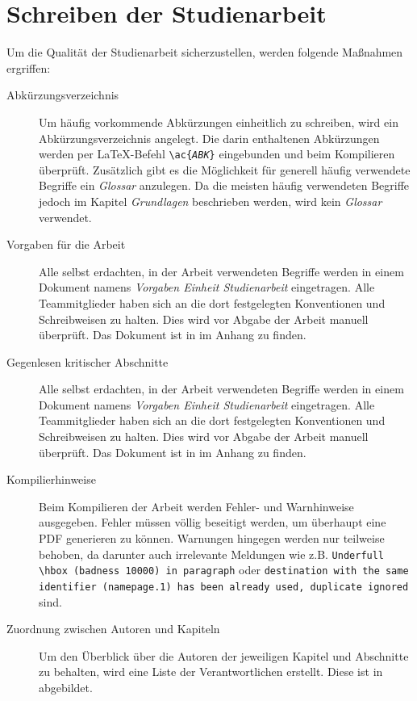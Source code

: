 \documentclass[
	pdftex,
	fontsize=12pt,          %
	DIV10,                  %
	ngerman,                %
	paper=a4,               %
	twoside=false,          %
	titlepage,              %
	parskip=half,           %
	headings=normal,        %
	listof=nochaptergap,  %
	bibliography=totoc, %
	index=totoc,            %
	captions=tableheading,  %
	final                 %
]{scrreprt}
\begin{document}
\section{Schreiben der Studienarbeit}
Um die Qualität der Studienarbeit sicherzustellen, werden folgende Maßnahmen ergriffen:

\begin{description}
	\item[Abkürzungsverzeichnis]{Um häufig vorkommende Abkürzungen einheitlich zu schreiben, wird ein Abkürzungsverzeichnis angelegt. Die darin enthaltenen Abkürzungen werden per LaTeX-Befehl \texttt{\textbackslash ac\{\textit{ABK}\}} eingebunden und beim Kompilieren überprüft. Zusätzlich gibt es die Möglichkeit für generell häufig verwendete Begriffe ein \textit{Glossar} anzulegen. Da die meisten häufig verwendeten Begriffe jedoch im Kapitel \textit{Grundlagen} beschrieben werden, wird kein \textit{Glossar} verwendet.}
	\item[Vorgaben für die Arbeit]{Alle selbst erdachten, in der Arbeit verwendeten Begriffe werden in einem Dokument namens \textit{Vorgaben Einheit Studienarbeit} eingetragen. Alle Teammitglieder haben sich an die dort festgelegten Konventionen und Schreibweisen zu halten. Dies wird vor Abgabe der Arbeit manuell überprüft. Das Dokument ist in  im Anhang zu finden.}
	\item[Gegenlesen kritischer Abschnitte]{Alle selbst erdachten, in der Arbeit verwendeten Begriffe werden in einem Dokument namens \textit{Vorgaben Einheit Studienarbeit} eingetragen. Alle Teammitglieder haben sich an die dort festgelegten Konventionen und Schreibweisen zu halten. Dies wird vor Abgabe der Arbeit manuell überprüft. Das Dokument ist in  im Anhang zu finden.}
	\item[Kompilierhinweise]{Beim Kompilieren der Arbeit werden Fehler- und Warnhinweise ausgegeben. Fehler müssen völlig beseitigt werden, um überhaupt eine PDF generieren zu können. Warnungen hingegen werden nur teilweise behoben, da darunter auch irrelevante Meldungen wie z.B. \texttt{Underfull \textbackslash hbox (badness 10000) in paragraph} oder \texttt{destination with the same identifier (name{page.1}) has been already used, duplicate ignored} sind.}
	\item[Zuordnung zwischen Autoren und Kapiteln]{Um den Überblick über die Autoren der jeweiligen Kapitel und Abschnitte zu behalten, wird eine Liste der Verantwortlichen erstellt. Diese ist in  abgebildet.}
\end{description}
\end{document}
